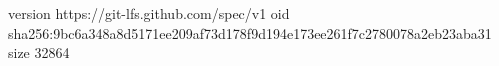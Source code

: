 version https://git-lfs.github.com/spec/v1
oid sha256:9bc6a348a8d5171ee209af73d178f9d194e173ee261f7c2780078a2eb23aba31
size 32864
